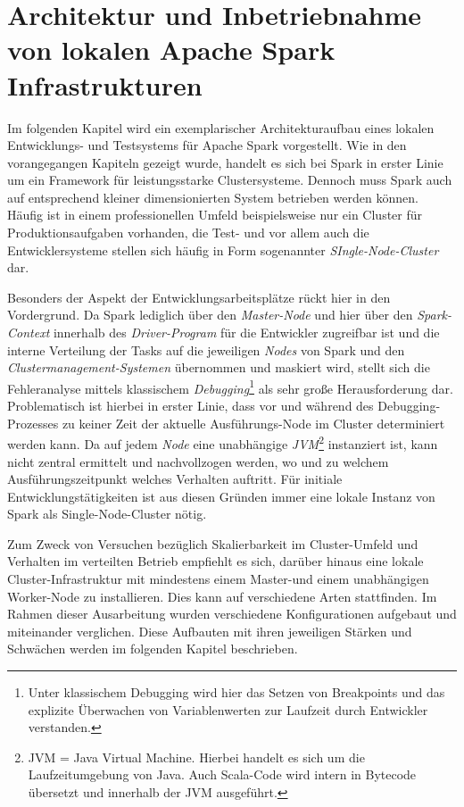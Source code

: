 \chapter{Architektur und Inbetriebnahme von lokalen Apache Spark Infrastrukturen }
\label{chapter:architektur}



Im folgenden Kapitel wird ein exemplarischer Architekturaufbau eines lokalen Entwicklungs- und Testsystems für Apache Spark vorgestellt. Wie in den vorangegangen Kapiteln gezeigt wurde, handelt es sich bei Spark in erster Linie um ein Framework für leistungsstarke Clustersysteme. Dennoch muss Spark auch auf entsprechend kleiner dimensionierten System betrieben werden können. Häufig ist in einem professionellen Umfeld beispielsweise nur ein Cluster für Produktionsaufgaben vorhanden, die Test- und vor allem auch die Entwicklersysteme stellen sich häufig in Form sogenannter \textit{SIngle-Node-Cluster} dar. 

Besonders der Aspekt der Entwicklungsarbeitsplätze rückt hier in den Vordergrund. Da Spark lediglich über den \textit{Master-Node} und hier über den \textit{Spark-Context} innerhalb des \textit{Driver-Program} für die Entwickler zugreifbar ist und die interne Verteilung der Tasks auf die jeweiligen \textit{Nodes} von Spark und den \textit{Clustermanagement-Systemen} übernommen und maskiert wird, stellt sich die Fehleranalyse mittels klassischem \textit{Debugging}\footnote{Unter klassischem Debugging wird hier das Setzen von Breakpoints und das explizite Überwachen von Variablenwerten zur Laufzeit durch Entwickler verstanden.} als sehr große Herausforderung dar. Problematisch ist hierbei in erster Linie, dass vor und während des Debugging-Prozesses zu keiner Zeit der aktuelle Ausführungs-Node im Cluster determiniert werden kann. Da auf jedem \textit{Node} eine unabhängige \textit{JVM}\footnote{JVM = Java Virtual Machine. Hierbei handelt es sich um die Laufzeitumgebung von Java. Auch Scala-Code wird intern in Bytecode übersetzt und innerhalb der JVM ausgeführt.} instanziert ist, kann nicht zentral ermittelt und nachvollzogen werden, wo und zu welchem Ausführungszeitpunkt welches Verhalten auftritt. Für initiale Entwicklungstätigkeiten ist aus diesen Gründen immer eine lokale Instanz von Spark als Single-Node-Cluster nötig.

Zum Zweck von Versuchen bezüglich Skalierbarkeit im Cluster-Umfeld und Verhalten im verteilten Betrieb empfiehlt es sich, darüber hinaus eine lokale Cluster-Infrastruktur mit mindestens einem Master-und einem unabhängigen Worker-Node zu installieren. Dies kann auf verschiedene Arten stattfinden. Im Rahmen dieser Ausarbeitung wurden verschiedene Konfigurationen aufgebaut und miteinander verglichen. Diese Aufbauten mit ihren jeweiligen Stärken und Schwächen werden im folgenden Kapitel beschrieben. 

